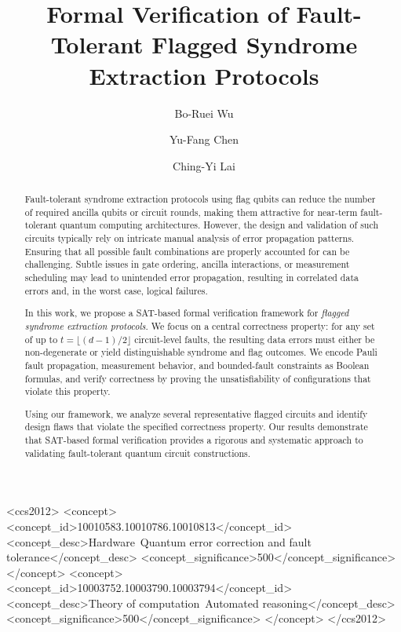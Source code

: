 \documentclass[acmsmallw,review]{acmart}
\newcommand{\cy}[1]{}
\begin{document}
\title{Formal Verification of Fault-Tolerant Flagged Syndrome Extraction Protocols}

\author{Bo-Ruei Wu}

\author{Yu-Fang Chen}

\author{Ching-Yi Lai}

\begin{abstract}
Fault-tolerant syndrome extraction protocols using flag qubits can reduce the number of required ancilla qubits or circuit rounds, making them attractive for near-term fault-tolerant quantum computing architectures. However, the design and validation of such circuits typically rely on intricate manual analysis of error propagation patterns. Ensuring that all possible fault combinations are properly accounted for can be challenging. Subtle issues in gate ordering, ancilla interactions, or measurement scheduling may lead to unintended error propagation, resulting in correlated data errors and, in the worst case, logical failures.

In this work, we propose a SAT-based formal verification framework for \emph{flagged syndrome extraction protocols}. We focus on a central correctness property: for any set of up to $t = \lfloor (d-1)/2 \rfloor$ circuit-level faults, the resulting data errors must either be non-degenerate or yield distinguishable syndrome and flag outcomes. We encode Pauli fault propagation, measurement behavior, and bounded-fault constraints as Boolean formulas, and verify correctness by proving the unsatisfiability of configurations that violate this property.
 
Using our framework, we analyze several representative flagged circuits and identify design flaws that violate the specified correctness property. Our results demonstrate that SAT-based formal verification provides a rigorous and systematic approach to validating fault-tolerant quantum circuit constructions.
\end{abstract}


\begin{CCSXML}
<ccs2012>
   <concept>
       <concept_id>10010583.10010786.10010813</concept_id>
       <concept_desc>Hardware~Quantum error correction and fault tolerance</concept_desc>
       <concept_significance>500</concept_significance>
   </concept>
   <concept>
       <concept_id>10003752.10003790.10003794</concept_id>
       <concept_desc>Theory of computation~Automated reasoning</concept_desc>
       <concept_significance>500</concept_significance>
   </concept>
 </ccs2012>
\end{CCSXML}
\end{document}
